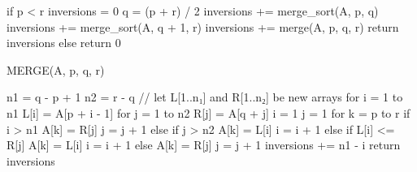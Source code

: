 \startANSWER
{}
\startCLRS
if p < r
	inversions = 0
	q = (p + r) / 2
	inversions += merge_sort(A, p, q)
	inversions += merge_sort(A, q + 1, r)
	inversions += merge(A, p, q, r)
	return inversions
else
	return 0

MERGE(A, p, q, r)

n1 = q - p + 1
n2 = r - q
// let L[1..n₁] and R[1..n₂] be new arrays
for i = 1 to n1
	L[i] = A[p + i - 1]
for j = 1 to n2
	R[j] = A[q + j]
i = 1
j = 1
for k = p to r
	if i > n1
		A[k] = R[j]
		j = j + 1
	else if j > n2
		A[k] = L[i]
		i = i + 1
	else if L[i] <= R[j]
		A[k] = L[i]
		i = i + 1
	else
		A[k] = R[j]
		j = j + 1
		inversions += n1 - i
return inversions
\stopCLRS
\stopANSWER

\stopigBase
\stopPROBLEM

\stopsubject
